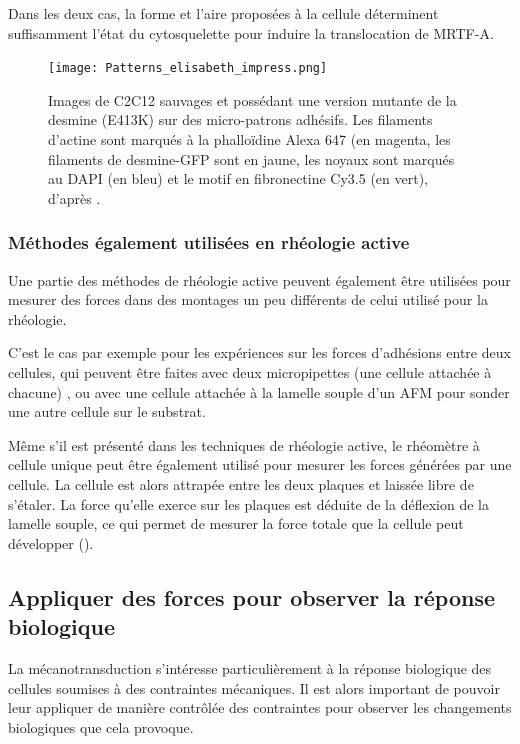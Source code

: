 Dans les deux cas, la forme et l'aire proposées à la cellule déterminent suffisamment l'état du cytosquelette pour induire la translocation de MRTF-A.  

\begin{figure}
\texttt{[image: Patterns\_elisabeth\_impress.png]}
\caption{Images de C2C12 sauvages et possédant une version mutante de la desmine (E413K) sur des micro-patrons adhésifs. Les filaments d'actine sont marqués à la phalloïdine Alexa 647 (en magenta, les filaments de desmine-GFP sont en jaune, les noyaux sont marqués au DAPI (en bleu) et le motif en fibronectine Cy3.5 (en vert), d'après \cite{charrier_implication_2014}.}
\end{figure}


\subsubsection{Méthodes également utilisées en rhéologie active}

Une partie des méthodes de rhéologie active peuvent également être utilisées pour mesurer des forces dans des montages un peu différents de celui utilisé pour la rhéologie. 

C'est le cas par exemple pour les expériences sur les forces d'adhésions entre deux cellules, qui peuvent être faites avec deux micropipettes (une cellule attachée à chacune) \parencite{biro_dual_2015}, ou avec une cellule attachée à la lamelle souple d'un AFM pour sonder une autre cellule sur le substrat. 

Même s'il est présenté dans les techniques de rhéologie active, le rhéomètre à cellule unique peut être également utilisé pour mesurer les forces générées par une cellule. 
La cellule est alors attrapée entre les deux plaques et laissée libre de s'étaler. La force qu'elle exerce sur les plaques est déduite de la déflexion de la lamelle souple, ce qui permet de mesurer la force totale que la cellule peut développer (\cite{mitrossilis_single-cell_2009}). 

\subsection{Appliquer des forces pour observer la réponse biologique}

La mécanotransduction s'intéresse particulièrement à la réponse biologique des cellules soumises à des contraintes mécaniques. 
Il est alors important de pouvoir leur appliquer de manière contrôlée des contraintes pour observer les changements biologiques que cela provoque. 

